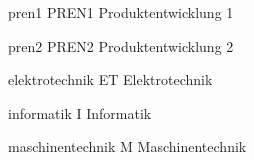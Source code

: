 \newacronym
  {pren1}                 %
  {PREN1}                %
  {Produktentwicklung 1}  %

\newacronym
  {pren2}                 %
  {PREN2}                %
  {Produktentwicklung 2}  %

\newacronym
  {elektrotechnik}                    %
  {ET}                    %
  {Elektrotechnik}        %

\newacronym
  {informatik}             %
  {I}                      %
  {Informatik}             %
  
\newacronym
  {maschinentechnik}       %
  {M}                      %
  {Maschinentechnik}       %